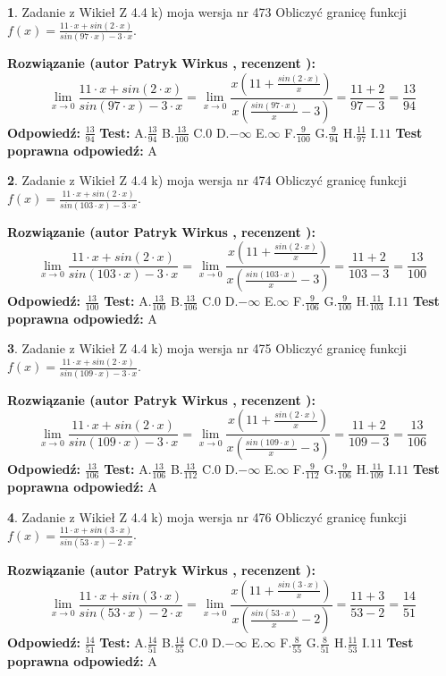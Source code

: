 \documentclass[12pt, a4paper]{article}
\theoremstyle{definition} %
\newtheorem{zad}{}
\newcommand{\zadStart}[1]{\begin{zad}#1\newline}
\newcommand{\zadStop}{\end{zad}}
\newcommand{\rozwStart}[2]{\noindent \textbf{Rozwiązanie (autor #1 , recenzent #2): }\newline}
\newcommand{\rozwStop}{\newline}
\newcommand{\odpStart}{\noindent \textbf{Odpowiedź:}\newline}
\newcommand{\odpStop}{\newline}
\newcommand{\testStart}{\noindent \textbf{Test:}\newline}
\newcommand{\testStop}{\newline}
\newcommand{\kluczStart}{\noindent \textbf{Test poprawna odpowiedź:}\newline}
\newcommand{\kluczStop}{\newline}
\begin{document}
\zadStart{Zadanie z Wikieł Z 4.4 k) moja wersja nr 473}
Obliczyć granicę funkcji $f(x)=\frac{11\cdot x +sin(2\cdot x)}{sin(97\cdot x) -3\cdot x}$.
\zadStop
\rozwStart{Patryk Wirkus}{}
$$\lim\limits_{x\to 0}\frac{11\cdot x +sin(2\cdot x)}{sin(97\cdot x) -3\cdot x}
=\lim\limits_{x\to 0}\frac{x(11+\frac{sin(2\cdot x)}{x})}{x(\frac{sin(97\cdot x)}{x}-3)}
=\frac{11+2}{97-3} = \frac{13}{94}$$
\rozwStop
\odpStart
$\frac{13}{94}$
\odpStop
\testStart
A.$\frac{13}{94}$
B.$\frac{13}{100}$
C.$0$
D.$-\infty$
E.$\infty$
F.$\frac{9}{100}$
G.$\frac{9}{94}$
H.$\frac{11}{97}$
I.$11$
\testStop
\kluczStart
A
\kluczStop



\zadStart{Zadanie z Wikieł Z 4.4 k) moja wersja nr 474}
Obliczyć granicę funkcji $f(x)=\frac{11\cdot x +sin(2\cdot x)}{sin(103\cdot x) -3\cdot x}$.
\zadStop
\rozwStart{Patryk Wirkus}{}
$$\lim\limits_{x\to 0}\frac{11\cdot x +sin(2\cdot x)}{sin(103\cdot x) -3\cdot x}
=\lim\limits_{x\to 0}\frac{x(11+\frac{sin(2\cdot x)}{x})}{x(\frac{sin(103\cdot x)}{x}-3)}
=\frac{11+2}{103-3} = \frac{13}{100}$$
\rozwStop
\odpStart
$\frac{13}{100}$
\odpStop
\testStart
A.$\frac{13}{100}$
B.$\frac{13}{106}$
C.$0$
D.$-\infty$
E.$\infty$
F.$\frac{9}{106}$
G.$\frac{9}{100}$
H.$\frac{11}{103}$
I.$11$
\testStop
\kluczStart
A
\kluczStop



\zadStart{Zadanie z Wikieł Z 4.4 k) moja wersja nr 475}
Obliczyć granicę funkcji $f(x)=\frac{11\cdot x +sin(2\cdot x)}{sin(109\cdot x) -3\cdot x}$.
\zadStop
\rozwStart{Patryk Wirkus}{}
$$\lim\limits_{x\to 0}\frac{11\cdot x +sin(2\cdot x)}{sin(109\cdot x) -3\cdot x}
=\lim\limits_{x\to 0}\frac{x(11+\frac{sin(2\cdot x)}{x})}{x(\frac{sin(109\cdot x)}{x}-3)}
=\frac{11+2}{109-3} = \frac{13}{106}$$
\rozwStop
\odpStart
$\frac{13}{106}$
\odpStop
\testStart
A.$\frac{13}{106}$
B.$\frac{13}{112}$
C.$0$
D.$-\infty$
E.$\infty$
F.$\frac{9}{112}$
G.$\frac{9}{106}$
H.$\frac{11}{109}$
I.$11$
\testStop
\kluczStart
A
\kluczStop



\zadStart{Zadanie z Wikieł Z 4.4 k) moja wersja nr 476}
Obliczyć granicę funkcji $f(x)=\frac{11\cdot x +sin(3\cdot x)}{sin(53\cdot x) -2\cdot x}$.
\zadStop
\rozwStart{Patryk Wirkus}{}
$$\lim\limits_{x\to 0}\frac{11\cdot x +sin(3\cdot x)}{sin(53\cdot x) -2\cdot x}
=\lim\limits_{x\to 0}\frac{x(11+\frac{sin(3\cdot x)}{x})}{x(\frac{sin(53\cdot x)}{x}-2)}
=\frac{11+3}{53-2} = \frac{14}{51}$$
\rozwStop
\odpStart
$\frac{14}{51}$
\odpStop
\testStart
A.$\frac{14}{51}$
B.$\frac{14}{55}$
C.$0$
D.$-\infty$
E.$\infty$
F.$\frac{8}{55}$
G.$\frac{8}{51}$
H.$\frac{11}{53}$
I.$11$
\testStop
\kluczStart
A
\kluczStop
\end{document}
